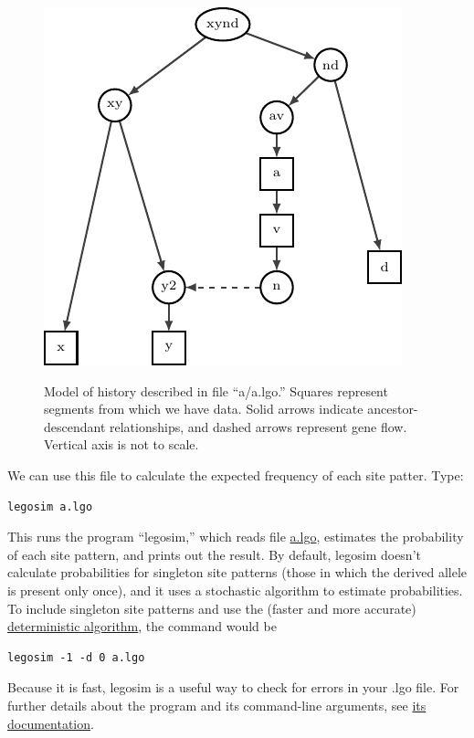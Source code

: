 \documentclass[11pt]{article}
\begin{document}
\begin{figure}
  {\centering\includegraphics{network.pdf}\\}
  \caption{Model of history described in file ``a/a.lgo.'' Squares
    represent segments from which we have data. Solid arrows indicate
    ancestor-descendant relationships, and dashed arrows represent
    gene flow. Vertical axis is not to scale.}
  \label{fig.network}
\end{figure}

We can use this file to calculate the expected frequency of each site
patter. Type:
\begin{verbatim}
legosim a.lgo
\end{verbatim}
This runs the program ``legosim,'' which reads file
\href{\verb|https://github.com/alanrogers/agar22/blob/main/6_legofit/europe/a/a.lgo|}{a.lgo},
estimates the probability of each site pattern, and prints out the
result. By default, legosim doesn't calculate probabilities for
singleton site patterns (those in which the derived allele is present
only once), and it uses a stochastic algorithm to estimate
probabilities. To include singleton site patterns and use the (faster
and more accurate)
\href{https://peercommunityjournal.org/articles/10.24072/pcjournal.132}{deterministic
  algorithm}, the command would be
\begin{verbatim}
legosim -1 -d 0 a.lgo
\end{verbatim}
Because it is fast, legosim is a useful way to check for errors in
your .lgo file. For further details about the program and its
command-line arguments, see
\href{http://alanrogers.github.io/legofit/html/legosim.html}{its
  documentation}.
\end{document}
